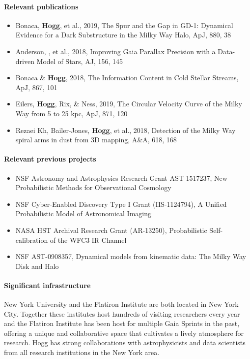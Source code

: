 \paragraph{Relevant publications}
\begin{itemize}
    \item Bonaca, \textbf{Hogg}, et al., 2019, The Spur and the Gap in GD-1: Dynamical Evidence for a Dark Substructure in the Milky Way Halo, ApJ, 880, 38
    \item Anderson, , et al., 2018, Improving Gaia Parallax Precision with a Data-driven Model of Stars, AJ, 156, 145
    \item Bonaca \& \textbf{Hogg}, 2018, The Information Content in Cold Stellar Streams, ApJ, 867, 101
    \item Eilers, \textbf{Hogg}, Rix, \& Ness, 2019, The Circular Velocity Curve of the Milky Way from 5 to 25 kpc, ApJ, 871, 120
    \item Rezaei Kh, Bailer-Jones, \textbf{Hogg}, et al., 2018, Detection of the Milky Way spiral arms in dust from 3D mapping, A\&A, 618, 168
\end{itemize}

\paragraph{Relevant previous projects}
\begin{itemize}
    \item NSF Astronomy and Astrophysics Research Grant AST-1517237, New Probabilistic Methods for Observational Cosmology
    \item NSF Cyber-Enabled Discovery Type I Grant (IIS-1124794), A Unified Probabilistic Model of Astronomical Imaging
    \item NASA HST Archival Research Grant (AR-13250), Probabilistic Self-calibration of the WFC3 IR Channel
    \item NSF AST-0908357, Dynamical models from kinematic data: The Milky Way Disk and Halo
\end{itemize}

\paragraph{Significant infrastructure}
New York University and the Flatiron Institute are both located in New York City. Together these institutes host hundreds of visiting researchers every year and the Flatiron Institute has been host for multiple Gaia Sprints in the past, offering a unique and collaborative space that cultivates a lively atmosphere for research.
Hogg has strong collaborations with astrophysicists and data scientists from all research institutions in the New York area.
